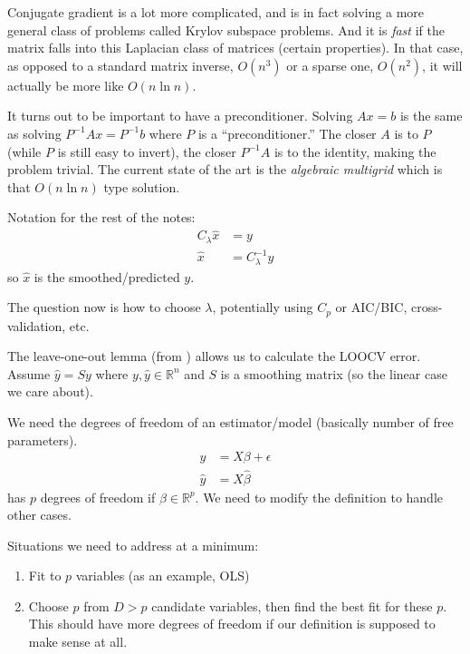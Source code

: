 \documentclass{article}
\begin{document}
Conjugate gradient is a lot more complicated, and is in fact solving a more general class of problems called Krylov subspace
problems. And it is \emph{fast} if the matrix falls into this
Laplacian class of matrices (certain properties). In that case, as opposed to a standard matrix inverse, $O(n^3)$ or
a sparse one, $O(n^2)$, it will actually be more like $O(n \ln n)$.

It turns out to be important to have a preconditioner. Solving $Ax=b$ is the same as solving $P^{-1}Ax=P^{-1}b$
where $P$ is a ``preconditioner.'' The closer $A$ is to $P$ (while $P$ is still easy to invert), the closer $P^{-1}A$ 
is to the identity, making the problem trivial. The current state of the art is the \emph{algebraic multigrid}
which is that $O(n \ln n)$ type solution.


\vspace{5ex} 

Notation for the rest of the notes:
\begin{align*}
C_\lambda\hat{x}&=y\\
\hat{x}&=C_\lambda^{-1}y
\end{align*}
so $\hat{x}$ is the smoothed/predicted $y$.

The question now is how to choose $\lambda$, potentially using $C_p$ or AIC/BIC, cross-validation, etc.

The leave-one-out lemma (from \cite{hastie2001elements})
allows us to calculate the LOOCV error. Assume $\hat{y}=Sy$
where $y,\hat{y}\in \mathbb{R}^n$ and $S$ is a smoothing matrix (so the linear case we care about).

We need the degrees of freedom of an estimator/model (basically number of free parameters).
\begin{align*}
y&=X\beta + \epsilon\\
\hat{y}&=X\hat{\beta}
\end{align*}
has $p$ degrees of freedom if $\beta\in\mathbb{R}^p$. We need to modify the definition to handle other cases.

Situations we need to address at a minimum:
\begin{enumerate}[1.]
\item Fit to $p$ variables (as an example, OLS)
\item Choose $p$ from $D>p$ candidate variables, then find the best fit for these $p$. This should have more degrees
of freedom if our definition is supposed to make sense at all.
\end{enumerate}
\end{document}
